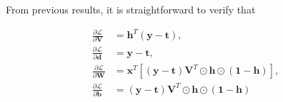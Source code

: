 \documentclass{article}
\begin{document}
From previous results, it is straightforward to verify that

\begin{equation}
\begin{split}
    \frac{\partial \mathcal{L}}{\partial \mathbf{V}} &=
        \mathbf{h}^T(\mathbf{y} - \mathbf{t}), \\
    \frac{\partial \mathcal{L}}{\partial \mathbf{d}} &=
        \mathbf{y} - \mathbf{t}, \\
    \frac{\partial \mathcal{L}}{\partial \mathbf{W}} &=
        \mathbf{x}^T \left[
            (\mathbf{y} - \mathbf{t}) \mathbf{V}^T
            \odot \mathbf{h} \odot (\mathbf{1} - \mathbf{h})
        \right], \\
    \frac{\partial \mathcal{L}}{\partial \mathbf{b}} &=
        (\mathbf{y} - \mathbf{t}) \mathbf{V}^T
        \odot \mathbf{h} \odot (\mathbf{1} - \mathbf{h}) \\
\end{split}
\end{equation}
\end{document}
